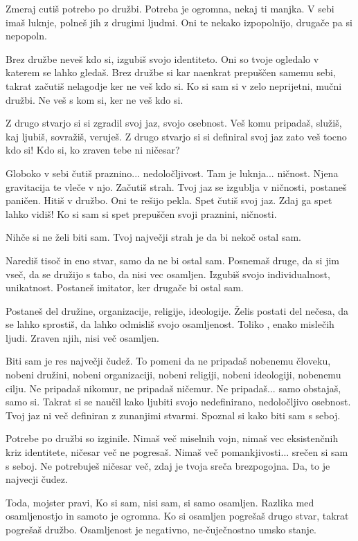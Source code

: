         

   Zmeraj cutiš potrebo po družbi. Potreba je ogromna, nekaj ti manjka. V sebi imaš luknje, polneš jih z drugimi ljudmi. Oni te nekako izpopolnijo, drugače pa si nepopoln. 

Brez družbe neveš kdo si, izgubiš svojo identiteto. Oni so tvoje ogledalo v katerem se lahko gledaš. Brez družbe si kar naenkrat prepuščen samemu sebi, takrat začutiš nelagodje ker ne veš kdo si. Ko si sam si v zelo neprijetni, mučni družbi. Ne veš s kom si, ker ne veš kdo si. 

Z drugo stvarjo si si zgradil svoj jaz, svojo osebnost. Veš komu pripadaš, služiš, kaj ljubiš, sovražiš, veruješ. Z drugo stvarjo si si definiral svoj jaz zato veš tocno kdo si! Kdo si, ko zraven tebe ni ničesar? 

Globoko v sebi čutiš praznino... nedoločljivost. Tam je luknja... ničnost. Njena gravitacija te vleče v njo. Začutiš strah. Tvoj jaz se izgublja v ničnosti, postaneš paničen. Hitiš v družbo. Oni te rešijo pekla. Spet čutiš svoj jaz. Zdaj ga spet lahko vidiš! Ko si sam si spet prepuščen svoji praznini, ničnosti. 

Nihče si ne želi biti sam. Tvoj največji strah je da bi nekoč ostal sam. 

Narediš tisoč in eno stvar, samo da ne bi ostal sam. Posnemaš druge, da si jim vseč, da se družijo s tabo, da nisi vec osamljen. Izgubiš svojo individualnost, unikatnost. Postaneš imitator, ker drugače bi ostal sam. 

Postaneš del družine, organizacije, religije, ideologije. Želis postati del nečesa, da se lahko sprostiš, da lahko odmisliš svojo osamljenost. Toliko , enako mislečih ljudi. Zraven njih, nisi več osamljen. 

Biti sam je res največji čudež. To pomeni da ne pripadaš nobenemu človeku, nobeni družini, nobeni organizaciji, nobeni religiji, nobeni ideologiji, nobenemu cilju. Ne pripadaš nikomur, ne pripadaš ničemur. Ne pripadaš... samo obstajaš, samo si. Takrat si se naučil kako ljubiti svojo nedefinirano, nedoločljivo osebnost. Tvoj jaz ni več definiran z zunanjimi stvarmi. Spoznal si kako biti sam s seboj. 

Potrebe po družbi so izginile. Nimaš več miselnih vojn, nimaš vec eksistenčnih kriz identitete, ničesar več ne pogresaš. Nimaš več pomankjivosti... srečen si sam s seboj. Ne potrebuješ ničesar več, zdaj je tvoja sreča brezpogojna. Da, to je najvecji čudez. 

Toda, mojster pravi,  Ko si sam, nisi sam, si samo osamljen. Razlika med osamljenostjo in samoto je ogromna. Ko si osamljen pogrešaš drugo stvar, takrat pogrešaš družbo. Osamljenost je negativno, ne-čuječnostno umsko stanje. 

